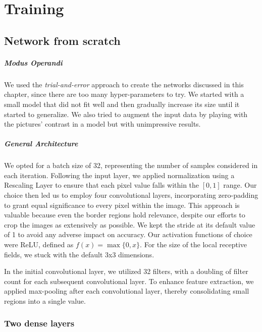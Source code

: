 \chapter{Training}

\section{Network from scratch}

\paragraph{Modus Operandi}
We used the \emph{trial-and-error} approach to create the networks discussed in this chapter, since there are too many hyper-parameters to try.  We started with a small model that did not fit well and then gradually increase
its size until it started to generalize. We also tried to augment the input data by playing with the pictures' contrast in a model but with unimpressive results.

\paragraph{General Architecture}
We opted for a batch size of 32, representing the number of samples considered in each iteration. Following the input layer, we applied normalization using a Rescaling Layer to ensure that each pixel value falls within the $[0,1]$ range. Our choice then led us to employ four convolutional layers, incorporating zero-padding to grant equal significance to every pixel within the image. This approach is valuable because even the border regions hold relevance, despite our efforts to crop the images as extensively as possible. We kept the stride at its default value of 1 to avoid any adverse impact on accuracy. Our activation functions of choice were ReLU, defined as $f(x) = \max\{0, x\}$. For the size of the local receptive fields, we stuck with the default 3x3 dimensions.

In the initial convolutional layer, we utilized 32 filters, with a doubling of filter count for each subsequent convolutional layer. To enhance feature extraction, we applied max-pooling after each convolutional layer, thereby consolidating small regions into a single value.

\subsection{Two dense layers}

